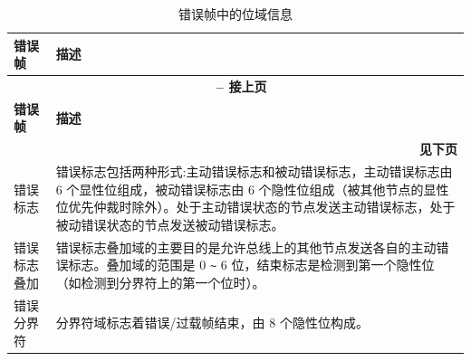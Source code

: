\begin{longtable}[c]{|p{2.5cm}|p{13cm}|} 
    
  \caption{错误帧中的位域信息}
  \label{tab:twai-error-frame} 
  \\\hline
  \rowcolor{lightgray}
  \textbf{错误帧} & \textbf{描述}
  \\\hline
  \endfirsthead
  
  \multicolumn{2}{c}{\bfseries \tablename\ \thetable{} -- 接上页}\\  \hline
  
  \rowcolor{lightgray}
    \textbf{错误帧} & \textbf{描述}
  \\\hline
  \endhead
  
  \multicolumn{2}{r}{\textbf{见下页}} \\
  \endfoot
  \endlastfoot
  

    错误标志 & 错误标志包括两种形式:主动错误标志和被动错误标志，主动错误标志由 6 个显性位组成，被动错误标志由 6 个隐性位组成（被其他节点的显性位优先仲裁时除外）。处于主动错误状态的节点发送主动错误标志，处于被动错误状态的节点发送被动错误标志。
          \\\hline
    错误标志叠加 & 错误标志叠加域的主要目的是允许总线上的其他节点发送各自的主动错误标志。叠加域的范围是 0 \verb+~+ 6 位，结束标志是检测到第一个隐性位（如检测到分界符上的第一个位时）。                               
           \\\hline
    错误分界符 & 分界符域标志着错误/过载帧结束，由 8 个隐性位构成。                                                   \\\hline
\end{longtable}
